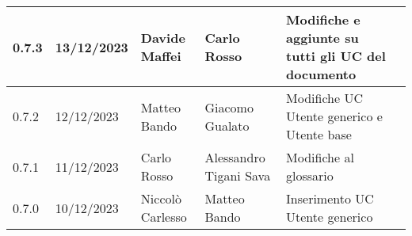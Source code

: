 \begin{table}[H]
\begin{tabularx}{\textwidth}{X|X|X|X|X|X}
		\hline
		0.7.3                 & 13/12/2023           & Davide Maffei          & Carlo Rosso                  & Modifiche e aggiunte su tutti gli UC del documento                                   \\
		\hline
		0.7.2                 & 12/12/2023           & Matteo Bando           & Giacomo Gualato                 & Modifiche UC Utente generico e Utente base                                     \\
		\hline
		0.7.1                 & 11/12/2023           & Carlo Rosso            & Alessandro Tigani Sava             & Modifiche al glossario                                     \\
		\hline
		0.7.0                 & 10/12/2023           & Niccolò Carlesso       & Matteo Bando           & Inserimento UC Utente generico                             \\
		\bottomrule
	\end{tabularx}
\end{table}


